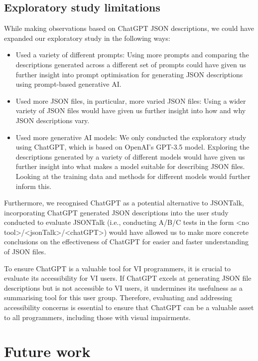 \documentclass{l4proj}
\begin{document}
\subsection{Exploratory study limitations}

While making observations based on ChatGPT JSON descriptions, we could have expanded our exploratory study in the following ways:

\begin{itemize}
    \item Used a variety of different prompts: Using more prompts and comparing the descriptions generated across a different set of prompts could have given us further insight into prompt optimisation for generating JSON descriptions using prompt-based generative AI.
    \item Used more JSON files, in particular, more varied JSON files: Using a wider variety of JSON files would have given us further insight into how and why JSON descriptions vary.
    \item Used more generative AI models: We only conducted the exploratory study using ChatGPT, which is based on OpenAI's GPT-3.5 model. Exploring the descriptions generated by a variety of different models would have given us further insight into what makes a model suitable for describing JSON files. Looking at the training data and methods for different models would further inform this.
\end{itemize}

Furthermore, we recognised ChatGPT as a potential alternative to JSONTalk, incorporating ChatGPT generated JSON descriptions into the user study conducted to evaluate JSONTalk (i.e., conducting A/B/C tests in the form <no tool>/<jsonTalk>/<chatGPT>) would have allowed us to make more concrete conclusions on the effectiveness of ChatGPT for easier and faster understanding of JSON files.

To ensure ChatGPT is a valuable tool for VI programmers, it is crucial to evaluate its accessibility for VI users. If ChatGPT excels at generating JSON file descriptions but is not accessible to VI users, it undermines its usefulness as a summarising tool for this user group. Therefore, evaluating and addressing accessibility concerns is essential to ensure that ChatGPT can be a valuable asset to all programmers, including those with visual impairments.

\section{Future work}
\end{document}
